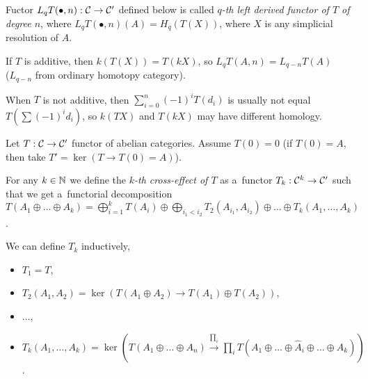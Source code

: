     \begin{definition}
        Fuctor $L_qT(\bullet, n): \mathcal{C} \to \mathcal{C}'$
        defined below is called 
        {\em $q$-th left derived functor of $T$ of degree $n$},
        where $L_qT(\bullet,n)(A) = H_q(T(X))$,
        where $X$ is any simplicial resolution of $A$.
    \end{definition}
    
    \begin{remark}
        If $T$ is additive, then $k(T(X)) = T(kX)$,
        so $L_qT(A,n) = L_{q-n}T(A)$
        \\ ($L_{q-n}$ from ordinary homotopy category).
    \end{remark}
    
    \begin{remark}
        When $T$ is not additive, then 
        $\sum_{i=0}^n (-1)^i T(d_i)$ is usually not equal
        $T(\sum (-1)^i d_i)$,
        so $k(TX)$ and $T(kX)$ may have different homology.
    \end{remark}
    
    Let $T:\mathcal{C} \to \mathcal{C}'$ functor of abelian categories.
    Assume $T(0) = 0$ (if $T(0)= A$, then take $T' = \ker(T \to T(0) = A)$).
    
    \begin{definition}
        For any ${k \in {\mathbb{N}}}$ we define the 
        {\em $k$-th cross-effect of $T$}
        as a~functor $T_k:\mathcal{C}^k \to \mathcal{C}'$
        such that we get a~functorial decomposition
        \\ $T(A_1 \oplus \ldots \oplus A_k)
        = \bigoplus_{i=1}^k T(A_i)
        \oplus \bigoplus_{i_1<i_2} T_2(A_{i_1}, A_{i_2})
        \oplus \ldots \oplus T_k(A_1, \ldots, A_k)$.
        
        We can define $T_k$ inductively,
        \begin{itemize}
            \item $T_1 = T$,
            \item $T_2(A_1,A_2) = 
            \ker(T(A_1 \oplus A_2) \to T(A_1) \oplus T(A_2))$,
            \item $\ldots$,
            \item $T_k(A_1, \ldots, A_k)
            = \ker(T(A_1 \oplus \ldots \oplus A_n) \xrightarrow{\prod_i}
            \prod_i T(A_1 \oplus \ldots \oplus \hat{A}_i \oplus \ldots \oplus A_k))$.
        \end{itemize}
    \end{definition}
    

